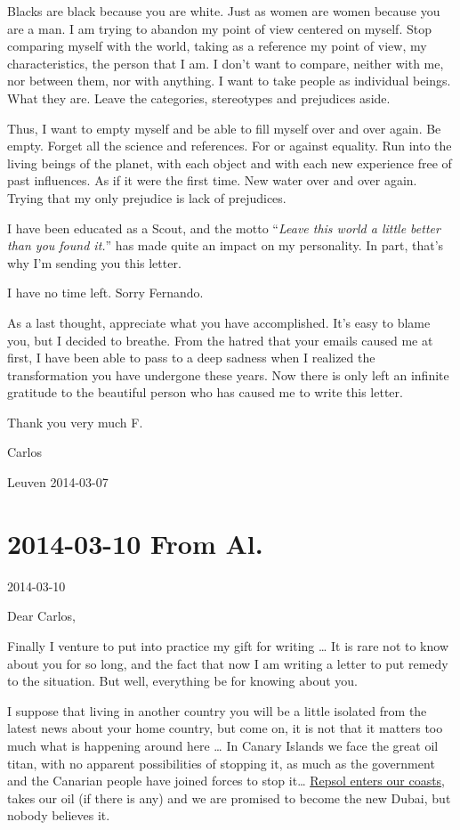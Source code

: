\documentclass[]{book}
\begin{document}
Blacks are black because you are white. Just as women are women because you are a man. I am trying to abandon my point of view centered on myself. Stop comparing myself with the world, taking as a reference my point of view, my characteristics, the person that I am. I don't want to compare, neither with me, nor between them, nor with anything. I want to take people as individual beings. What they are. Leave the categories, stereotypes and prejudices aside.

Thus, I want to empty myself and be able to fill myself over and over again. Be empty. Forget all the science and references. For or against equality. Run into the living beings of the planet, with each object and with each new experience free of past influences. As if it were the first time. New water over and over again. Trying that my only prejudice is lack of prejudices.

I have been educated as a Scout, and the motto ``\emph{Leave this world a little better than you found it.}'' has made quite an impact on my personality. In part, that's why I'm sending you this letter.

I have no time left. Sorry Fernando.

As a last thought, appreciate what you have accomplished. It's easy to blame you, but I decided to breathe. From the hatred that your emails caused me at first, I have been able to pass to a deep sadness when I realized the transformation you have undergone these years. Now there is only left an infinite gratitude to the beautiful person who has caused me to write this letter.

Thank you very much F.

Carlos

Leuven 2014-03-07

\hypertarget{fromal20140310}{%
\section*{2014-03-10 From Al.}\label{fromal20140310}}

2014-03-10

Dear Carlos,

Finally I venture to put into practice my gift for writing \ldots{} It is rare not to know about you for so long, and the fact that now I am writing a letter to put remedy to the situation. But well, everything be for knowing about you.

I suppose that living in another country you will be a little isolated from the latest news about your home country, but come on, it is not that it matters too much what is happening around here \ldots{} In Canary Islands we face the great oil titan, with no apparent possibilities of stopping it, as much as the government and the Canarian people have joined forces to stop it\ldots{} \href{https://en.wikipedia.org/wiki/Repsol\#Canary_Islands}{Repsol enters our coasts}, takes our oil (if there is any) and we are promised to become the new Dubai, but nobody believes it.
\end{document}
